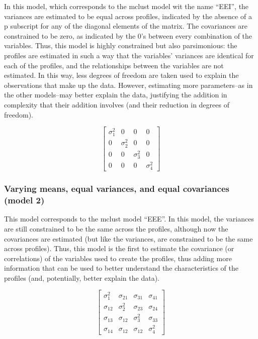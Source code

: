 \documentclass[]{msu-thesis}
\theoremstyle{definition}
\theoremstyle{definition}
\theoremstyle{definition}
\theoremstyle{remark}
\begin{document}
In this model, which corresponds to the mclust model wit the name
``EEI'', the variances are estimated to be equal across profiles,
indicated by the absence of a p subscript for any of the diagonal
elements of the matrix. The covariances are constrained to be zero, as
indicated by the 0's between every combination of the variables. Thus,
this model is highly constrained but also parsimonious: the profiles are
estimated in such a way that the variables' variances are identical for
each of the profiles, and the relationships between the variables are
not estimated. In this way, less degrees of freedom are taken used to
explain the observations that make up the data. However, estimating more
parameters--as in the other models--may better explain the data,
justifying the addition in complexity that their addition involves (and
their reduction in degrees of freedom).

\[
\left[ \begin{matrix} { \sigma  }_{ 1 }^{ 2 } & 0 & 0 & 0 \\ 0 & { \sigma  }_{ 2 }^{ 2 } & 0 & 0 \\ 0 & 0 & { \sigma  }_{ 3 }^{ 2 } & 0 \\ 0 & 0 & 0 & { \sigma  }_{ 4 }^{ 2 } \end{matrix} \right] 
\]

\subsubsection{Varying means, equal variances, and equal covariances
(model
2)}\label{varying-means-equal-variances-and-equal-covariances-model-2}

This model corresponds to the mclust model ``EEE''. In this model, the
variances are still constrained to be the same across the profiles,
although now the covariances are estimated (but like the variances, are
constrained to be the same across profiles). Thus, this model is the
first to estimate the covariance (or correlations) of the variables used
to create the profiles, thus adding more information that can be used to
better understand the characteristics of the profiles (and, potentially,
better explain the data).

\[
\left[ \begin{matrix} { \sigma  }_{ 1 }^{ 2 } & { \sigma  }_{ 21 } & { \sigma  }_{ 31 } & { \sigma  }_{ 41 } \\ { \sigma  }_{ 12 } & { \sigma  }_{ 2 }^{ 2 } & { \sigma  }_{ 23 } & { \sigma  }_{ 24 } \\ { \sigma  }_{ 13 } & { \sigma  }_{ 12 } & { \sigma  }_{ 3 }^{ 2 } & { \sigma  }_{ 33 } \\ { \sigma  }_{ 14 } & { \sigma  }_{ 12 } & { \sigma  }_{ 12 } & { \sigma  }_{ 4 }^{ 2 } \end{matrix} \right] 
\]
\end{document}

